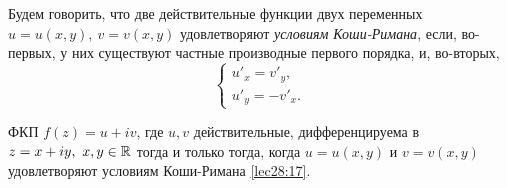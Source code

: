 \documentclass[../../main.tex]{subfiles}
\begin{document}
Будем говорить, что две действительные функции двух переменных
$u = u(x, y),\ v = v(x, y)$ удовлетворяют \emph{условиям Коши-Римана},
если, во-первых, у них существуют частные производные первого порядка,
и, во-вторых,
\begin{equation}
\label{lec28:17}
\begin{cases}
	u'_x = v'_y, \\
	u'_y = -v'_x.
\end{cases}
\end{equation}
\begin{thm}
	ФКП $f(z) = u + i v$, где $u, v$ действительные, дифференцируема в
	$z = x + i y,\ x, y \in \mathbb{R}$ тогда и только тогда, когда
	$u = u(x, y)$ и $v = v(x, y)$ удовлетворяют условиям Коши-Римана 
	\eqref{lec28:17}.
\end{thm}
\end{document}
